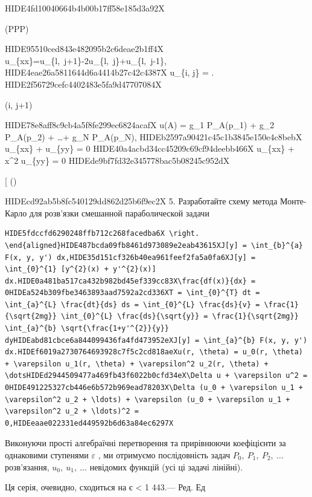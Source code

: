 \documentclass[
  ukrainian,
]{article}
\begin{document}
HIDE4fd10040664b4b00b17ff58e185d3a92X

(PPP)

HIDE95510ced843e482095b2c6deae2b1ff4X
u\_\{xx\}=u\_\{l,~j+1\}-2u\_\{l,~j\}+u\_\{l,~j-1\},
HIDE4eae26a5811644d6a4414b27c42c4387X u\_\{i, j\} =
.
HIDE2f56729cefc4402483e5fa9d47707084X

(i, j+1)

HIDE78e8aff8c9cb4a5f8fe299ec6824acafX u(A) = g\_1 P\_A(p\_1) + g\_2
P\_A(p\_2) + \dots + g\_N P\_A(p\_N),
HIDEb2597a90421c45c1b3845e150e4c8bebX u\_\{xx\} + u\_\{yy\} = 0
HIDE40a4acbd34cc45209c69cf94deebb466X u\_\{xx\} + x\^{}2 u\_\{yy\} = 0
HIDEde9bf7fd32e345778bac5b08245c952dX

{[} () \qquad {]}

HIDEcd92ab5b8fc540129dd862d25b6f9ec2X 5. Разработайте схему метода
Монте-Карло для розв'язки смешанной параболической задачи

\begin{verbatim}
HIDE5fdccfd6290248ffb712c268facedba6X \right. \end{aligned}HIDE487bcda09fb8461d973089e2eab43615XJ[y] = \int_{b}^{a} F(x, y, y') dx,HIDE35d151cf326b40ea961feef2fa5a0fa6XJ[y] = \int_{0}^{1} [y^{2}(x) + y'^{2}(x)] dx.HIDE0a481ba517ca432b982bd45ef339cc83X\frac{df(x)}{dx} = 0HIDEa524b309fbe3463893aad7592a2cd336XT = \int_{0}^{T} dt = \int_{a}^{L} \frac{dt}{ds} ds = \int_{0}^{L} \frac{ds}{v} = \frac{1}{\sqrt{2mg}} \int_{0}^{L} \frac{ds}{\sqrt{y}} = \frac{1}{\sqrt{2mg}} \int_{a}^{b} \sqrt{\frac{1+y'^{2}}{y}} dyHIDEabd81cbce6a844099436fa4fd473952eXJ[y] = \int_{a}^{b} F(x, y, y') dx.HIDEf6019a2730764693928c7f5c2cd818aeXu(r, \theta) = u_0(r, \theta) + \varepsilon u_1(r, \theta) + \varepsilon^2 u_2(r, \theta) + \dotsHIDEd2944509477a469fb43f6022b0cfd34eX\Delta u + \varepsilon u^2 = 0HIDE491225327cb446e6b572b969ead78203X\Delta (u_0 + \varepsilon u_1 + \varepsilon^2 u_2 + \ldots) + \varepsilon (u_0 + \varepsilon u_1 + \varepsilon^2 u_2 + \ldots)^2 = 0,HIDEeaae022331ed449592b6d63a84ec6297X
\end{verbatim}

Виконуючи прості алгебраїчні перетворення та прирівнюючи коефіцієнти за
однаковими ступенями \(\varepsilon\) , ми отримуємо послідовність задач
\(P_0,\ P_1,\ P_2,\ \dots\) розв'язання, \(u_0,\ u_1,\ \dots\) невідомих
функцій (усі ці задачі лінійні).

Ця серія, очевидно, сходиться на \textbar{} є \textbar{} \textless{} 1
443.--- Ред. Ед
\end{document}
